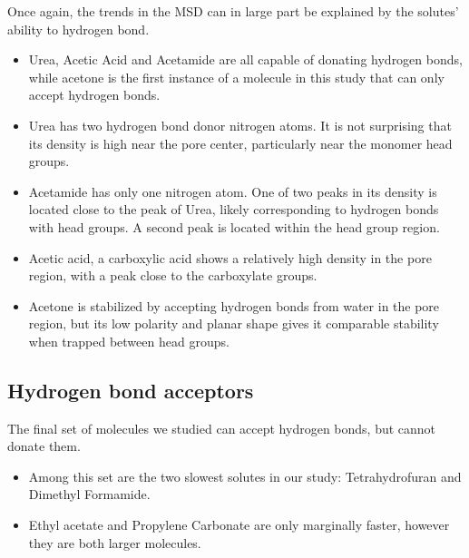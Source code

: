 \documentclass{article}
\begin{document}
  Once again, the trends in the MSD can in large part be explained by the solutes'
  ability to hydrogen bond.  %
  \begin{itemize}
  	\item Urea, Acetic Acid and Acetamide are all capable of donating hydrogen bonds,
  	while acetone is the first instance of a molecule in this study that can only
  	accept hydrogen bonds.
  	\item Urea has two hydrogen bond donor nitrogen atoms. It is not surprising that
  	its density is high near the pore center, particularly near the monomer head groups.
  	\item Acetamide has only one nitrogen atom. One of two peaks in its density is 
  	located close to the peak of Urea, likely corresponding to hydrogen bonds with head groups.
  	A second peak is located within the head group region. %
  	\item Acetic acid, a carboxylic acid shows a relatively high density in the pore region, with 
  	a peak close to the carboxylate groups.  %
  	\item Acetone is stabilized by accepting hydrogen bonds from water in the pore region, but
    its low polarity and planar shape gives it comparable stability when trapped between head groups.
  \end{itemize}
  
  \subsection*{Hydrogen bond acceptors}  %
  
  The final set of molecules we studied can accept hydrogen bonds, but cannot donate
  them. 
  \begin{itemize}
  	\item Among this set are the two slowest solutes in our study: Tetrahydrofuran and Dimethyl Formamide.
  	\item Ethyl acetate and Propylene Carbonate are only marginally faster, however they
  	are both larger molecules. %
  \end{itemize}
  
\end{document}
